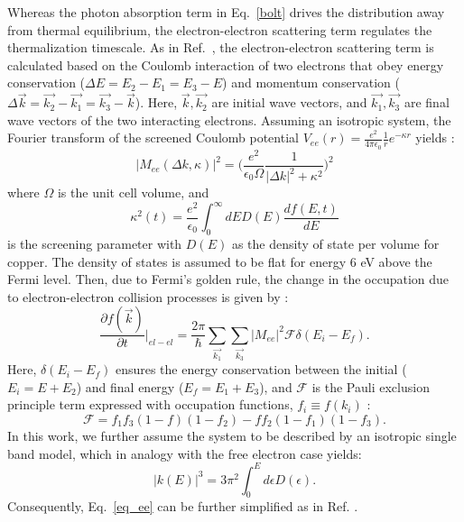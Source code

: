 Whereas the photon absorption term in Eq.~\ref{bolt} drives the distribution away from thermal equilibrium, the electron-electron scattering term regulates the thermalization timescale. As in Ref.~\cite{boltzmann}, the electron-electron scattering term is calculated based on the Coulomb interaction of two electrons that obey energy conservation ($\Delta E = E_2 - E_1 = E_3 - E$) and momentum conservation ($\Delta \vec{k} = \vec{k_2} - \vec{k_1} = \vec{k_3} - \vec{k}$).\cite{rethfeld,boltzmann} Here, $\vec{k}, \vec{k_2}$ are initial wave vectors, and $\vec{k_1}, \vec{k_3}$ are final wave vectors of the two interacting electrons. Assuming an isotropic system, the Fourier transform of the screened Coulomb potential $V_{ee}(r) = \frac{e^2}{4 \pi \epsilon_0}\frac{1}{r}e^{-\kappa r}$ yields \cite{Ashcroft1978,rethfeld}:
\begin{equation}\label{eq_m}
	|M_{ee}(\Delta k,\kappa)|^2 = \Big(\frac{e^2}{\epsilon_0 \Omega}\frac{1}{|\Delta k|^2 + \kappa^2}\Big)^2
\end{equation}
where $\Omega$ is the unit cell volume, and
\begin{equation}
	\kappa^2 (t) = \frac{e^2}{\epsilon_0}\int_0^\infty dE D(E) \frac{df(E,t)}{dE}
\end{equation}
is the screening parameter with $D(E)$ as the density of state per volume for copper.\cite{Lin2008} The density of states is assumed to be flat for energy 6 eV above the Fermi level. Then, due to Fermi's golden rule, the change in the occupation due to electron-electron collision processes is given by \cite{boltzmann,rethfeld}:
\begin{equation}\label{eq_ee}
	\frac{\partial f(\vec{k})}{\partial t}\biggr|_{el-el} = \frac{2 \pi}{\hbar}\sum_{\vec{k_1}}\sum_{\vec{k_3}} |M_{ee}|^2 \mathcal{F} \delta(E_i-E_f).
\end{equation}
Here, $\delta(E_i-E_f)$ ensures the energy conservation between the initial ($E_i = E + E_2$) and final energy ($E_f = E_1 + E_3$), and $\mathcal{F}$ is the Pauli exclusion principle term expressed with occupation functions, $f_i \equiv f(k_i)$ \cite{rethfeld,boltzmann,skin}:
\begin{equation}
	\mathcal{F} = f_1 f_3 (1-f)(1-f_2) - f f_2(1-f_1)(1-f_3).
\end{equation}
In this work, we further assume the system to be described by an isotropic single band model, which in analogy with the free electron case yields:
\begin{equation}
	|k(E)|^3 = 3\pi^2 \int_0^E d\epsilon D(\epsilon).
\end{equation} 
Consequently, Eq.~\ref{eq_ee} can be further simplified as in Ref. \cite{boltzmann}.


